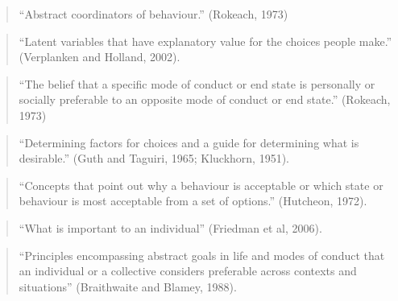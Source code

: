 \begin{quotation}
``Abstract coordinators of behaviour.'' (Rokeach, 1973)
\end{quotation}
\begin{quotation}
``Latent variables that have explanatory value for the choices people make.'' (Verplanken and Holland, 2002).
\end{quotation}
\begin{quotation}
``The belief that a specific mode of conduct or end state is personally or socially preferable to an opposite mode of conduct or end state.'' (Rokeach, 1973)
\end{quotation}
\begin{quotation}
``Determining factors for choices and a guide for determining what is desirable.'' (Guth and Taguiri, 1965; Kluckhorn, 1951).
\end{quotation}
\begin{quotation}
``Concepts that point out why a behaviour is acceptable or which state or behaviour is most acceptable from a set of options.'' (Hutcheon, 1972).
\end{quotation}
\begin{quotation}
``What is important to an individual'' (Friedman et al, 2006).
\end{quotation}
\begin{quotation}
``Principles encompassing abstract goals in life and modes of conduct that an individual or a collective considers preferable across contexts and situations'' (Braithwaite and Blamey, 1988).
\end{quotation}


